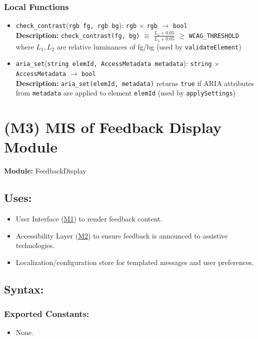 \documentclass[12pt, titlepage]{article}
\begin{document}
\subsubsection{Local Functions}

\begin{itemize}
  \item \texttt{check\_contrast}(\texttt{rgb fg, rgb bg}): \texttt{rgb} $\times$ \texttt{rgb} $\rightarrow$ \texttt{bool} \\
  \textbf{Description:} \texttt{check\_contrast(fg, bg)} $\equiv$ \(\frac{L_1 + 0.05}{L_2 + 0.05}\) $\geq$ \texttt{WCAG\_THRESHOLD} where $L_1, L_2$ are relative luminances of fg/bg (used by \texttt{validateElement})

  \item \texttt{aria\_set}(\texttt{string elemId, AccessMetadata metadata}): \texttt{string} $\times$ \texttt{AccessMetadata} $\rightarrow$ \texttt{bool} \\
  \textbf{Description:} \texttt{aria\_set(elemId, metadata)} returns \texttt{true} if ARIA attributes from \texttt{metadata} are applied to element \texttt{elemId} (used by \texttt{applySettings})
\end{itemize}

\newpage
\section{(M3) MIS of Feedback Display Module}
\label{M3}

\textbf{Module:} FeedbackDisplay

\subsection{Uses:}
\begin{itemize}
  \item User Interface (\hyperref[M1]{M1}) to render feedback content.
  \item Accessibility Layer (\hyperref[M2]{M2}) to ensure feedback is announced to assistive technologies.
  \item Localization/configuration store for templated messages and user preferences.
\end{itemize}

\subsection{Syntax:}

\subsubsection{Exported Constants:}
\begin{itemize}
  \item None.
\end{itemize}
\end{document}
